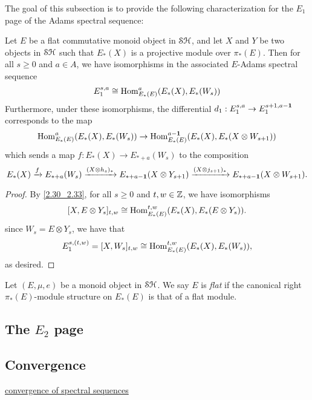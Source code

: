 \documentclass[../main.tex]{subfiles}
\begin{document}
The goal of this subsection is to provide the following characterization for the $E_1$ page of the Adams spectral sequence:

\begin{theorem}
	Let $E$ be a flat commutative monoid object in $\mathcal{SH}$, and let $X$ and $Y$ be two objects in $\mathcal{SH}$ such that $E_\ast(X)$ is a projective module over $\pi_\ast(E)$. Then for all $s\geq0$ and $a\in A$, we have isomorphisms in the associated $E$-Adams spectral sequence
	\[E_1^{s,a}\cong\mathrm{Hom}_{E_\ast(E)}^{a}(E_\ast(X),E_\ast(W_s))\]
	Furthermore, under these isomorphisms, the differential $d_1:E_1^{s,a}\to E_1^{s+1,a-\mathbf{1}}$ corresponds to the map
	\[\mathrm{Hom}_{E_\ast(E)}^{a}(E_\ast(X),E_\ast(W_s))\to\mathrm{Hom}_{E_\ast(E)}^{a-\mathbf{1}}(E_\ast(X),E_\ast(X\otimes W_{s+1}))\]
	which sends a map $f:E_\ast(X)\to E_{\ast+a}(W_s)$ to the composition 
	\[E_\ast(X)\xrightarrow f E_{\ast+a}(W_s)\xrightarrow{(X\otimes h_s)_\ast}E_{\ast+a-\mathbf{1}}(X\otimes Y_{s+1})\xrightarrow{(X\otimes j_{s+1})_\ast}E_{\ast+a-\mathbf{1}}(X\otimes W_{s+1}).\]
\end{theorem}
\begin{proof}
	By \autoref{2.30_2.33}, for all $s\geq0$ and $t,w\in\mathbb{Z}$, we have isomorphisms
	\[[X,E\otimes Y_s]_{t,w}\cong\mathrm{Hom}_{E_\ast(E)}^{t,w}(E_\ast(X),E_\ast(E\otimes Y_s)).\]
	since $W_s=E\otimes Y_s$, we have that
	\[E_1^{s,(t,w)}=[X,W_s]_{t,w}\cong\mathrm{Hom}_{E_\ast(E)}^{t,w}(E_\ast(X),E_\ast(W_s)),\]
	as desired. 
\end{proof}

\begin{definition}
	Let $(E,\mu,e)$ be a monoid object in $\mathcal{SH}$. We say $E$ is \emph{flat} if the canonical right $\pi_\ast(E)$-module structure on $E_\ast(E)$ is that of a flat module.
\end{definition}

\subsection{The \texorpdfstring{$E_2$}{TEXT} page}

\subsection{Convergence}

\href{https://www.uio.no/studier/emner/matnat/math/MAT9580/v12/undervisningsmateriale/boardman-conditionally-1999.pdf}{convergence of spectral sequences}
\end{document}
